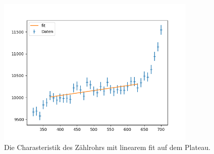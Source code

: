 \begin{figure}[H]
    \centering
    \includegraphics[width=0.85\textwidth]{build/plots/a.png}
    \caption{Die Charasteristik des Zählrohrs mit linearem fit auf dem Plateau.}
    \label{img:plot1}
\end{figure}


